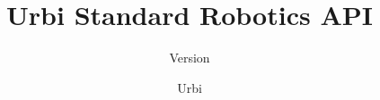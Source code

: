 \documentclass[openright,twoside,11pt]{book}
\title{Urbi Standard Robotics API}
\subtitle{Version \VcsDescription}
\author{Urbi}
\begin{document}
\maketitle
\tableofcontents
{
  \raisesections
  \let\chapter\section
  
}

\chapterIndex
\end{document}
